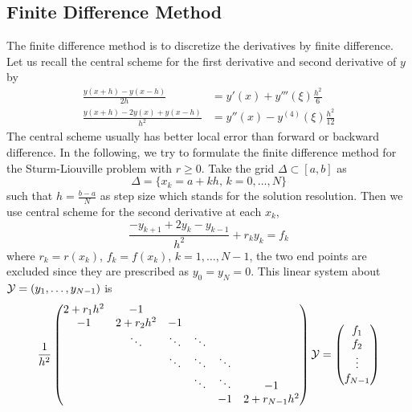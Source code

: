 \subsection{Finite Difference Method}
The finite difference method is to discretize the derivatives by finite difference. Let us recall the central scheme for the first derivative and second derivative of $y$ by 
\begin{equation}
    \begin{aligned}
        \frac{y(x + h) - y(x - h)}{2h} &= y'(x) + y'''(\xi)\frac{h^2}{6} \\
        \frac{y(x + h) - 2 y(x) + y(x - h)}{h^2} &= y''(x) - y^{(4)}(\xi)\frac{h^2}{12}
    \end{aligned}
\end{equation}
The central scheme usually has better local error than forward or backward difference. In the following, we try to formulate the finite difference method for the Sturm-Liouville problem with $r\ge 0$. Take the grid $\Delta\subset [a, b]$ as 
\begin{equation}
    \Delta = \{x_k = a + k h, \, k = 0,\dots, N\}
\end{equation}
such that $h = \frac{b-a}{N}$ as step size which stands for the solution resolution. Then we use central scheme for the second derivative at each $x_k$,
\begin{equation}
    \frac{-y_{k+1} + 2 y_k - y_{k-1}}{h^2} + r_k y_k = f_k
\end{equation}
where $r_k = r(x_k)$, $f_k = f(x_k)$, $k = 1,\dots, N-1$, the two end points are excluded since they are prescribed as $y_0 = y_N = 0$. This linear system about $\mathcal Y = (y_1,\dots, y_{N-1})$ is 
\begin{equation}
    \frac{1}{h^2}\begin{pmatrix}
        2 + r_1h^2 & - 1 &&&&\\
        -1 & 2 + r_2 h^2 & -1 &&&\\
        &\ddots &\ddots & \ddots && \\ 
        & &\ddots &\ddots & \ddots & \\ 
        & &&\ddots & \ddots & -1 \\
        &&&& -1 & 2 + r_{N-1} h^2  
    \end{pmatrix}  \mathcal Y = \begin{pmatrix}
        f_1\\f_2\\\vdots \\ f_{N-1}
    \end{pmatrix}
\end{equation}
